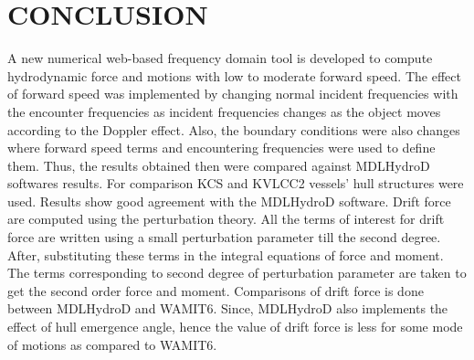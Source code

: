 \chapter{CONCLUSION}

A new numerical web-based frequency domain tool is developed to compute hydrodynamic force 
and motions with low to moderate forward speed. The effect of forward speed was implemented by 
changing normal incident frequencies with the encounter frequencies as incident frequencies
changes as the object moves according to the Doppler effect. Also, the boundary conditions were also
changes where forward speed terms and encountering frequencies were used to define them. Thus, the 
results obtained then were compared against MDLHydroD softwares results. For comparison KCS and KVLCC2
vessels' hull structures were used. Results show good agreement with the MDLHydroD software.
Drift force are computed using the perturbation theory. All the terms of interest for drift force are 
written using a small perturbation parameter till the second degree. After, substituting these terms 
in the integral equations of force and moment. The terms corresponding to second degree of perturbation 
parameter are taken to get the second order force and moment. Comparisons of drift force is done 
between MDLHydroD and WAMIT6. Since, MDLHydroD also implements the effect of hull emergence angle, hence
the value of drift force is less for some mode of motions as compared to WAMIT6. 
 